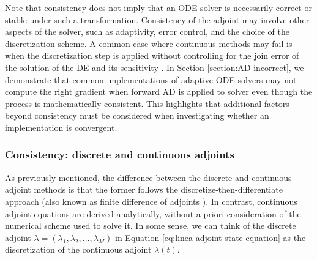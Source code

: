 Note that consistency does not imply that an ODE solver is necessarily correct or stable under such a transformation. 
Consistency of the adjoint may involve other aspects of the solver, such as adaptivity, error control, and the choice of the discretization scheme. 
A common case where continuous methods may fail is when the discretization step is applied without controlling for the join error of the solution of the DE and its sensitivity \cite{Gunzburger_2002}. 
In Section \ref{section:AD-incorrect}, we demonstrate that common implementations of adaptive ODE solvers may not compute the right gradient when forward AD is applied to solver even though the process is mathematically consistent. 
This highlights that additional factors beyond consistency must be considered when investigating whether an implementation is convergent.

\subsubsection{Consistency: discrete and continuous adjoints}

As previously mentioned, the difference between the discrete and continuous adjoint methods is that the former follows the discretize-then-differentiate approach (also known as finite difference of adjoints \cite{Sirkes_Tziperman_1997}).
In contrast, continuous adjoint equations are derived analytically, without a priori consideration of the numerical scheme used to solve it. 
In some sense, we can think of the discrete adjoint $\lambda = (\lambda_1, \lambda_2, \ldots, \lambda_M)$ in Equation \eqref{eq:linea-adjoint-state-equation} as the discretization of the continuous adjoint $\lambda(t)$. 

